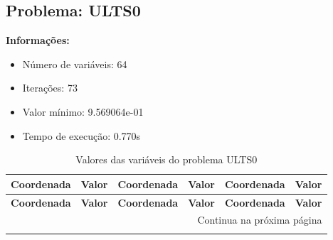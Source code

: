 \documentclass[12pt]{article}
\begin{document}
\newpage            
\subsection{Problema: ULTS0}

\textbf{Informações:}
\begin{itemize}
\item Número de variáveis: 64
\item Iterações: 73
\item Valor mínimo: 9.569064e-01
\item Tempo de execução: 0.770s
\end{itemize}

\small
\begin{longtable}{@{}cc|cc|cc@{}}
\caption{Valores das variáveis do problema ULTS0} \\
\toprule
\textbf{Coordenada} & \textbf{Valor} & \textbf{Coordenada} & \textbf{Valor} & \textbf{Coordenada} & \textbf{Valor} \\
\midrule
\endfirsthead

\toprule
\textbf{Coordenada} & \textbf{Valor} & \textbf{Coordenada} & \textbf{Valor} & \textbf{Coordenada} & \textbf{Valor} \\
\midrule
\endhead

\midrule \multicolumn{6}{r}{{Continua na próxima página}} \\ \midrule
\endfoot


\end{longtable}
\end{document}

